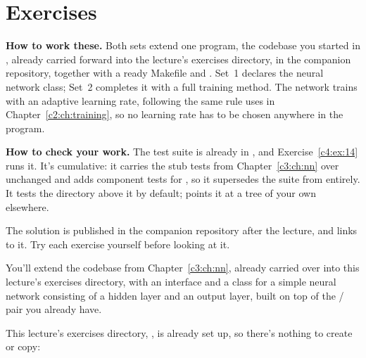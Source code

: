 
\section{Exercises}
\label{c4:sec:exercises}\label{c4:app:b}

\begin{aside}
\textbf{How to work these.} Both sets extend one program, the  codebase you started in
, already carried forward into the lecture's exercises directory,
 in the companion repository, together with a ready Makefile and
. Set~1 declares the neural network class; Set~2 completes it with a full training method.
The network trains with an adaptive learning rate, following the same rule
 uses in Chapter~\ref{c2:ch:training}, so no learning rate has to be
chosen anywhere in the program.

\textbf{How to check your work.} The test suite is already in
, and Exercise~\ref{c4:ex:14} runs it. It's cumulative:
it carries the stub tests from Chapter~\ref{c3:ch:nn} over unchanged and adds component tests for
, so it supersedes the suite from  entirely. It tests the
directory above it by default;  points it at a tree of your own elsewhere.

The solution is published in the companion repository after the lecture, and
 links to it. Try each exercise yourself before looking at it.
\end{aside}

\label{c4:set:1}
You'll extend the codebase from Chapter~\ref{c3:ch:nn}, already carried over into this lecture's
exercises directory, with an interface and a class for a simple
neural network consisting of a hidden layer and an output layer, built on top of the
/ pair you already have.

\label{c4:ex:1}
This lecture's exercises directory, , is already set up, so there's
nothing to create or copy:

